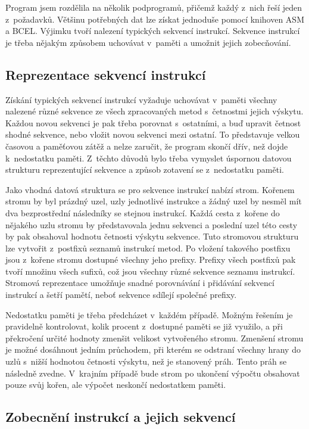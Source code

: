 Program jsem rozdělila na několik podprogramů, přičemž každý z~nich řeší jeden z~požadavků. 
Většinu potřebných dat lze získat jednoduše pomocí knihoven ASM a BCEL. Výjimku tvoří nalezení typických sekvencí instrukcí. Sekvence instrukcí je třeba nějakým způsobem uchovávat v~paměti a umožnit jejich zobecňování.

\subsection{Reprezentace sekvencí instrukcí}

Získání typických sekvencí instrukcí vyžaduje uchovávat v~paměti všechny nalezené různé sekvence ze všech zpracovaných metod s~četnostmi jejich výskytu. Každou novou sekvenci je pak třeba porovnat s~ostatními, a buď upravit četnost shodné sekvence, nebo vložit novou sekvenci mezi ostatní. To představuje velkou časovou a paměťovou zátěž a nelze zaručit, že program skončí dřív, než dojde k~nedostatku paměti. Z~těchto důvodů bylo třeba vymyslet úspornou datovou strukturu reprezentující sekvence a způsob zotavení se z~nedostatku paměti.

Jako vhodná datová struktura se pro sekvence instrukcí nabízí strom. Kořenem stromu by byl prázdný uzel, uzly jednotlivé instrukce a žádný uzel by nesměl mít dva bezprostřední následníky se stejnou instrukcí. Každá cesta z~kořene do nějakého uzlu stromu by představovala jednu sekvenci a poslední uzel této cesty by pak obsahoval hodnotu četnosti výskytu sekvence. Tuto stromovou strukturu lze vytvořit z~postfixů seznamů instrukcí metod. 
Po vložení takového postfixu jsou z~kořene stromu dostupné všechny jeho prefixy. Prefixy všech postfixů pak tvoří množinu všech sufixů, což jsou všechny různé sekvence seznamu instrukcí.
Stromová reprezentace umožňuje snadné porovnávání i přidávání sekvencí instrukcí a šetří pamětí, neboť sekvence sdílejí společné prefixy.

Nedostatku paměti je třeba předcházet v~každém případě. Možným řešením je pravidelně kontrolovat, kolik procent z~dostupné paměti se již využilo, a při překročení určité hodnoty zmenšit velikost vytvořeného stromu. Zmenšení stromu je možné dosáhnout jedním průchodem, při kterém se odstraní všechny hrany do uzlů s~nižší hodnotou četnosti výskytu, než je stanovený práh. Tento práh se následně zvedne. V~krajním případě bude strom po ukončení výpočtu obsahovat pouze svůj kořen, ale výpočet neskončí nedostatkem paměti.

\subsection{Zobecnění instrukcí a jejich sekvencí}

